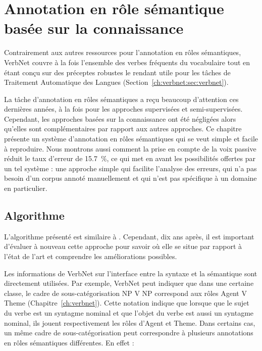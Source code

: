 \chapter{Annotation en rôle sémantique basée sur la connaissance}
\label{ch:srl}



Contrairement aux autres ressources pour l'annotation en rôles sémantiques,
VerbNet couvre à la fois l'ensemble des verbes fréquents du vocabulaire tout en
étant conçu sur des préceptes robustes le rendant utile pour les tâches de
Traitement Automatique des Langues (Section~\ref{ch:verbnet:sec:verbnet}).

La tâche d'annotation en rôles sémantiques a reçu beaucoup d'attention ces
dernières années, à la fois pour les approches supervisées et semi-supervisées.
Cependant, les approches basées sur la connaissance ont été négligées alors
qu'elles sont complémentaires par rapport aux autres approches. Ce chapitre
présente un système d'annotation en rôles sémantiques qui se veut simple et
facile à reproduire. Nous montrons aussi comment la prise en compte de la voix
passive réduit le taux d'erreur de 15.7~\%, ce qui met en avant les
possibilités offertes par un tel système : une approche simple qui facilite
l'analyse des erreurs, qui n'a pas besoin d'un corpus annoté manuellement et
qui n'est pas spécifique à un domaine en particulier.

\section{Algorithme}

L'algorithme présenté est similaire à
\cite{swier2004unsupervised,swier2005exploiting}. Cependant, dix ans après, il
est important d'évaluer à nouveau cette approche pour savoir où elle se situe
par rapport à l'état de l'art et comprendre les améliorations possibles.

Les informations de VerbNet sur l'interface entre la syntaxe et la sémantique
sont directement utilisées. Par exemple, VerbNet peut indiquer que dans une
certaine classe, le cadre de sous-catégorisation NP V NP correspond aux rôles
Agent V Theme (Chapitre~\ref{ch:verbnet}). Cette notation indique que lorsque
que le sujet du verbe est un syntagme nominal et que l'objet du verbe est aussi
un syntagme nominal, ils jouent respectivement les rôles d'Agent et Theme. Dans
certains cas, un même cadre de sous-catégorisation peut correspondre à
plusieurs annotations en rôles sémantiques différentes. En effet :

